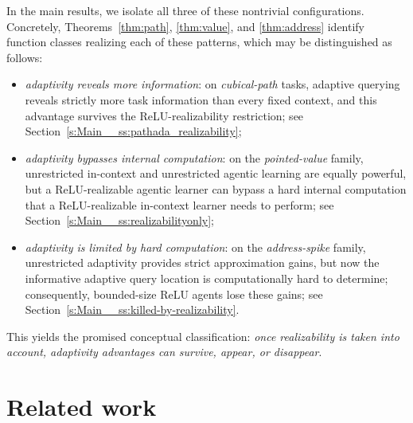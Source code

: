 \documentclass{article}
\begin{document}
In the main results, we isolate all three of these nontrivial configurations.
Concretely,
Theorems~\ref{thm:path}, \ref{thm:value}, and \ref{thm:address} identify function classes realizing each of these patterns, which may be distinguished as follows: %
\begin{itemize}
    \item \emph{adaptivity reveals more information}: on \emph{cubical-path} tasks, adaptive querying
    reveals strictly more task information than every fixed context, and this advantage survives the
    ReLU-realizability restriction; see Section~\ref{s:Main__ss:pathada_realizability};
    \item \emph{adaptivity bypasses internal computation}: on the \emph{pointed-value} family,
    unrestricted in-context and unrestricted agentic learning are equally powerful, but a ReLU-realizable
    agentic learner can bypass a hard internal computation that a ReLU-realizable in-context learner needs to perform; %
    see Section~\ref{s:Main__ss:realizabilityonly};
    \item %
    \emph{adaptivity is limited by hard computation}:
    on the \emph{address-spike} family,
    unrestricted adaptivity provides strict approximation gains, %
    but now the informative adaptive query location is computationally hard to determine; %
    consequently, %
    bounded-size %
    ReLU agents %
    lose these gains; %
    see
    Section~\ref{s:Main__ss:killed-by-realizability}.
\end{itemize}

This yields the promised conceptual classification: \emph{once realizability is taken into account,
adaptivity advantages can survive, appear, or disappear}. 






\section{Related work}
\end{document}
